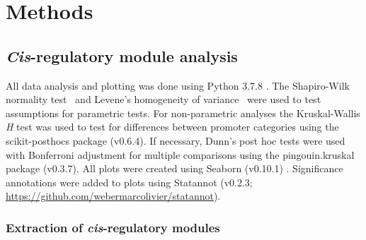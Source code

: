 \documentclass[../main.tex]{subfiles}
\begin{document}
\chapter{Methods}\label{chapter2}
\section{\textit{Cis}-regulatory module analysis}\label{chapter2:methods:cis-regulatory-module-analysis}
All data analysis and plotting was done using Python 3.7.8 \autocite{pythoncoreteamPythonDynamicOpen2020}.
The Shapiro\hyp{}Wilk normality test~\autocite{shapiroAnalysisVarianceTest1965} and Levene's homogeneity of variance~\autocite{leveneRobustTestsEquality1960} were used to test assumptions for parametric tests.
For non\hyp{}parametric analyses the Kruskal\hyp{}Wallis \textit{H} test \autocite{kruskalUseRanksOneCriterion1952} was used to test for differences between promoter categories using the scikit-posthocs package (v0.6.4)\autocite{terpilowskiScikitposthocsPairwiseMultiple2019}.
If necessary, Dunn's post hoc tests \autocite{dunnMultipleComparisonsUsing1964} were used with Bonferroni adjustment for multiple comparisons using the pingouin.kruskal package (v0.3.7)\autocite{vallatPingouinStatisticsPython2018}.
All plots were created using Seaborn (v0.10.1) \autocite{michael_waskom_2020_3767070}.
Significance annotations were added to plots using Statannot (v0.2.3; \url{https://github.com/webermarcolivier/statannot}).

\subsection{Extraction of \textit{cis}-regulatory modules}\label{chapter2:methods:extraction-of-cis-regulatory-modules}
\end{document}
